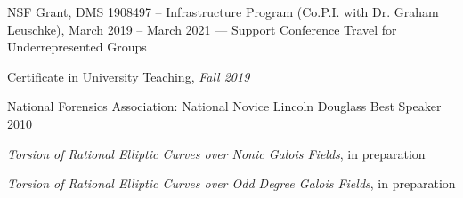 
\begin{enumTriangle}
\item {}
\item {}
\item {} 
\end{enumTriangle} \twomedskip\twomedskip








\begin{enumDiamond}
\item NSF Grant, DMS 1908497 -- Infrastructure Program (Co.P.I. with Dr. Graham Leuschke), March 2019 -- March 2021 --- Support Conference Travel for Underrepresented Groups
\end{enumDiamond} 

\begin{enumDiamond}
\item Certificate in University Teaching, {\itshape Fall 2019}
\item National Forensics Association: National Novice Lincoln Douglass Best Speaker 2010 
\end{enumDiamond} \twomedskip











\begin{enumDiamond}[itemsep=0.1cm]
\item {\itshape Torsion of Rational Elliptic Curves over Nonic Galois Fields}, in preparation

\item {\itshape Torsion of Rational Elliptic Curves over Odd Degree Galois Fields}, in preparation
\end{enumDiamond} \pspace


